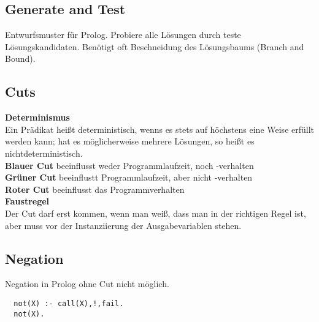 \subsection{Generate and Test}
Entwurfsmuster für Prolog. Probiere alle Lösungen durch teste Lösungskandidaten. Benötigt oft Beschneidung des
Lösungsbaums (Branch and Bound).

\subsection{Cuts}
\textbf{Determinismus}\\
Ein Prädikat heißt deterministisch, wenns es stets auf höchstens eine Weise erfüllt werden kann; hat es
möglicherweise mehrere Lösungen, so heißt es nichtdeterministisch.\\

\textbf{Blauer Cut} beeinflusst weder Programmlaufzeit, noch -verhalten\\
\textbf{Grüner Cut} beeinflustt Programmlaufzeit, aber nicht -verhalten\\
\textbf{Roter Cut} beeinflusst das Programmverhalten\\

\textbf{Faustregel}\\
Der Cut darf erst kommen, wenn man weiß, dass man in der richtigen Regel ist, aber muss vor der
Instanziierung der Ausgabevariablen stehen.

\subsection{Negation}
Negation in Prolog ohne Cut nicht möglich.
\begin{lstlisting}
  not(X) :- call(X),!,fail.
  not(X).
\end{lstlisting}